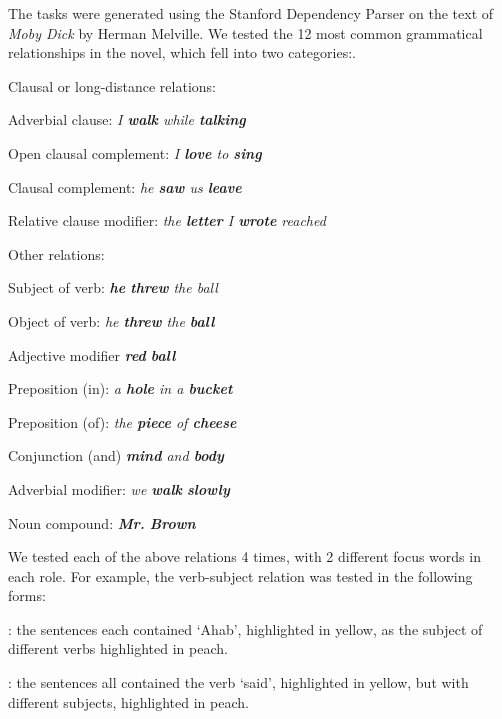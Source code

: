 The tasks were generated using the Stanford Dependency Parser \cite{de2006generating} on the text of \emph{Moby Dick} by Herman Melville.  We tested the 12 most common grammatical relationships in the novel, which fell into two categories:.

\squishlist
\item Clausal or long-distance relations:
	\squishlist
		\item {} Adverbial clause: \emph{ I \textbf{walk} while \textbf{talking}}
		\item  {} Open clausal complement:  \emph{I \textbf{love} to \textbf{sing} }
		\item  {} Clausal complement:  \emph{ he \textbf{saw} us \textbf{leave}}
		\item  {} Relative clause modifier:  \emph{the \textbf{letter} I \textbf{wrote} reached }
	\squishend
\item Other relations:
		\squishlist
			\item {} Subject of verb: \emph{\textbf{he} \textbf{threw} the ball}
			\item {} Object of verb:  \emph{ he \textbf{threw} the \textbf{ball}}
			\item {} Adjective modifier \emph{\textbf{red} \textbf{ball}}
			\item {}  Preposition (in): \emph{a \textbf{hole} in a \textbf{bucket}}
			\item {}	Preposition (of):  \emph{ the \textbf{piece} of \textbf{cheese}}
			\item {}  Conjunction (and)  \emph{ \textbf{mind} and \textbf{body}}
		\item{} Adverbial modifier: \emph{  we \textbf{walk} \textbf{slowly}}
		\item {} Noun compound:  \emph{ \textbf{Mr.}  \textbf{Brown}}
		\squishend
\squishend

We tested each of the above relations 4 times, with 2 different focus words in each role. For example, the verb-subject relation  was tested in the following forms:
\squishlist
	\item {}:  the sentences each contained `Ahab', highlighted in yellow, as the subject of different verbs highlighted in peach.
	\item {}

	\item {}: the sentences all contained the verb `said', highlighted in yellow, but with different subjects, highlighted in peach.
	\item {}
\squishend

